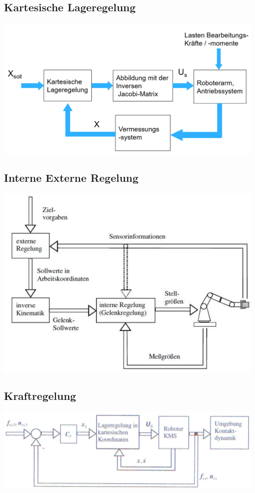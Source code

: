 \begin{minipage}{0.5\linewidth}
    \subsection{Kartesische Lageregelung}
    \includegraphics[width=\linewidth]{./bilder/KartLageRegelung}
\end{minipage}
\begin{minipage}{0.5\linewidth}
    \subsection{Interne Externe Regelung}
    \includegraphics[width=0.8\linewidth]{./bilder/InternExternRegelung}
\end{minipage}
\begin{minipage}{0.5\linewidth}
    \subsection{Kraftregelung}
    \includegraphics[width=\linewidth]{./bilder/KraftRegelung}
\end{minipage}
